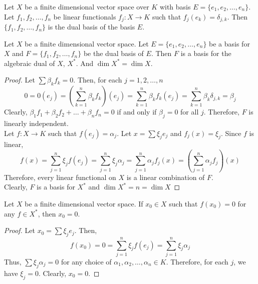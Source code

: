 \begin{definition}
	Let $X$ be a finite dimensional vector space over $K$ with basis $E = \{e_1,e_2,\dots,e_n\}$.
	Let $f_1,f_2,\dots,f_n$ be linear functionals $f_j : X \to K$ such that $f_j(e_k) = \delta_{j,k}$.
	Then $\{f_1,f_2,\dots,f_n\}$ is the dual basis of the basis $E$.
\end{definition}

\begin{theorem}
	Let $X$ be a finite dimensional vector space.
	Let $E = \{ e_1,e_2,\dots,e_n \}$ be a basis for $X$ and $F = \{ f_1,f_2,\dots,f_n \}$ be the dual basis of $E$.
	Then $F$ is a basis for the algebraic dual of $X$, $X^\ast$.
	And $\dim X^\ast = \dim X$.
\end{theorem}
\begin{proof}
	Let $\sum \beta_k f_k = 0$.
	Then, for each $j = 1,2,\dots,n $
	\[ 0 = 0(e_j) = \left( \sum_{k = 1}^n \beta_k f_k\right)(e_j) =\sum_{k = 1}^n \beta_k f_k(e_j) =\sum_{k = 1}^n \beta_k \delta_{j,k} = \beta_j \]
	Clearly, $\beta_1f_1+\beta_2f_2+\dots+\beta_nf_n = 0$ if and only if $\beta_j = 0$ for all $j$.
	Therefore, $F$ is linearly independent.\\

	Let $f : X \to K$ such that $f(e_j) = \alpha_j$.
	Let $x = \sum \xi_j e_j$ and $f_j(x) = \xi_j$.
	Since $f$ is linear, 
	\[ f(x) = \sum_{j=1}^n \xi_j f(e_j) = \sum_{j=1}^n \xi_j \alpha_j = \sum_{j=1}^n \alpha_j f_j(x) = \left( \sum_{j=1}^n \alpha_j f_j \right) (x) \]
	Therefore, every linear functional on $X$ is a linear combination of $F$.\\
	Clearly, $F$ is a basis for $X^\ast$ and $\dim X^\ast = n = \dim X$
\end{proof}

\begin{lemma}
	Let $X$ be a finite dimensional vector space.
	If $x_0 \in X$ such that $f(x_0) = 0$ for any $f \in X^\ast$, then $x_0 = 0$.
\end{lemma}
\begin{proof}
	Let $x_0 = \sum \xi_j e_j$.
	Then,
	\[ f(x_0) = 0 = \sum_{j=1}^n \xi_j f(e_j) = \sum_{j=1}^n \xi_j \alpha_j \]
	Thus, $\sum \xi_j \alpha_j = 0$ for any choice of $\alpha_1,\alpha_2,\dots,\alpha_n \in K$.
	Therefore, for each $j$, we have $\xi_j = 0$.
	Clearly, $x_0 = 0$.
\end{proof}

